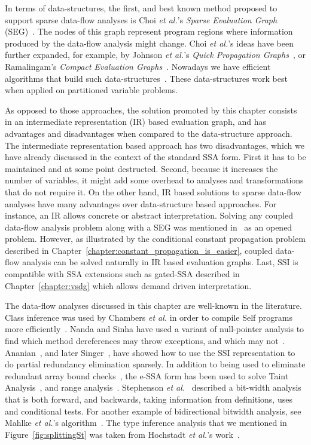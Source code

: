 In terms of data-structures, the first, and best known method proposed to support sparse data-flow analyses is Choi {\em et al.}'s {\em Sparse Evaluation Graph} (SEG)~\cite{Choi91}.
The nodes of this graph represent program regions where information produced by the data-flow analysis might change.
Choi {\em et al.}'s ideas have been further expanded, for example, by Johnson {\em et al.}'s {\em Quick Propagation Graphs}~\cite{Johnson93}, or Ramalingam's {\em Compact Evaluation Graphs}~\cite{Ramalingam02}.
Nowadays we have efficient algorithms that build such data-structures~\cite{Pingali95,Pingali97,Johnson94}.
These data-structures work best when applied on partitioned variable problems.

As opposed to those approaches, the solution promoted by this chapter consists in an intermediate representation (IR) based evaluation graph, and has advantages and disadvantages when compared to the data-structure approach.
The intermediate representation based approach has two disadvantages, which we have already discussed in the context of the standard SSA form.
First it has to be maintained and at some point destructed.
Second, because it increases the number of variables, it might add some overhead to analyses and transformations that do not require it.
On the other hand, IR based solutions to sparse data-flow analyses have many advantages over data-structure based approaches.
For instance, an IR allows concrete or abstract interpretation.
Solving any coupled data-flow analysis problem along with a SEG was mentioned in~\cite{Choi91} as an opened problem.
However, as illustrated by the conditional constant propagation problem described in Chapter~\ref{chapter:constant_propagation_is_easier}, coupled data-flow analysis can be solved naturally in IR based evaluation graphs.
Last, SSI is compatible with SSA extensions such as gated-SSA described in Chapter~\ref{chapter:vsdg} which allows demand driven interpretation.

The data-flow analyses discussed in this chapter are well-known in the literature.
Class inference was used by Chambers {\em et al.} in order to compile Self programs more efficiently~\cite{Chambers89}.
Nanda and Sinha have used a variant of null-pointer analysis to find which method dereferences may throw exceptions, and which may not~\cite{Nanda09}.
Ananian~\cite{Ananian99}, and later Singer~\cite{Singer06}, have showed how to use the SSI representation to do partial redundancy elimination sparsely.
In addition to being used to eliminate redundant array bound checks~\cite{Bodik00}, the e-SSA form has been used to solve Taint Analysis~\cite{Rimsa11}, and range analysis~\cite{Su05,Gawlitza09}.
Stephenson {\em et al.}~\cite{Stephenson00} described a bit-width analysis that is both forward, and backwards, taking information from definitions, uses and conditional tests.
For another example of bidirectional bitwidth analysis, see Mahlke {\em et al.}'s algorithm~\cite{Mahlke01}.
The type inference analysis that we mentioned in Figure~\ref{fig:splittingSt} was taken from Hochstadt {\em et al.}'s work~\cite{Hochstadt08}.

